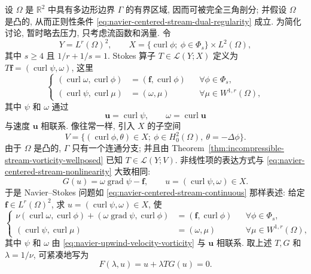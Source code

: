 设 $\Omega$ 是 $\mathbb R^2$ 中具有多边形边界 $\Gamma$ 的有界区域, 因而可被完全三角剖分;
并假设 $\Omega$ 是凸的, 从而正则性条件
\eqref{eq:navier-centered-stream-dual-regularity} 成立. 为简化讨论, 暂时略去压力,
只考虑流函数和涡量. 令
\[
Y=L^r(\Omega)^2,
\qquad
X=\{\operatorname{curl}\phi;\ \phi\in\Phi_s\}\times L^2(\Omega),
\]
其中 $s\geq4$ 且 $1/r+1/s=1$. Stokes 算子 $T\in\mathcal L(Y;X)$ 定义为
$T\boldsymbol f=(\operatorname{curl}\psi,\omega)$, 这里
\begin{equation}\label{eq:navier-upwind-stokes-operator}
\left\{
\begin{aligned}
(\operatorname{curl}\omega,\operatorname{curl}\phi)
&=(\boldsymbol f,\operatorname{curl}\phi)
&&\forall\phi\in\Phi_s,\\
(\operatorname{curl}\psi,\operatorname{curl}\mu)
&=(\omega,\mu)
&&\forall\mu\in W^{1,r}(\Omega),
\end{aligned}
\right.
\end{equation}
其中 $\psi$ 和 $\omega$ 通过
\begin{equation}\label{eq:navier-upwind-velocity-vorticity}
\boldsymbol u=\operatorname{curl}\psi,
\qquad
\omega=\operatorname{curl}\boldsymbol u
\end{equation}
与速度 $\boldsymbol u$ 相联系. 像往常一样, 引入 $X$ 的子空间
\begin{equation}\label{eq:navier-upwind-continuous-subspace}
V=\{(\operatorname{curl}\phi,\theta)\in X;
\ \phi\in H_0^2(\Omega),\ \theta=-\Delta\phi\}.
\end{equation}
由于 $\Omega$ 是凸的, $\Gamma$ 只有一个连通分支; 并且由
Theorem~\ref{thm:incompressible-stream-vorticity-wellposed} 已知 $T\in\mathcal L(Y;V)$.
非线性项的表达方式与 \eqref{eq:navier-centered-stream-nonlinearity} 大致相同:
\begin{equation}\label{eq:navier-upwind-nonlinearity}
G(u)=\omega\operatorname{grad}\psi-\boldsymbol f,
\qquad
u=(\operatorname{curl}\psi,\omega)\in X.
\end{equation}
于是 Navier--Stokes 问题如 \eqref{eq:navier-centered-stream-continuous} 那样表述:
给定 $\boldsymbol f\in L^r(\Omega)^2$, 求
$u=(\operatorname{curl}\psi,\omega)\in X$, 使
\begin{equation}\label{eq:navier-upwind-continuous-problem}
\left\{
\begin{aligned}
\nu(\operatorname{curl}\omega,\operatorname{curl}\phi)
+(\omega\operatorname{grad}\psi,\operatorname{curl}\phi)
&=(\boldsymbol f,\operatorname{curl}\phi)
&&\forall\phi\in\Phi_s,\\
(\operatorname{curl}\psi,\operatorname{curl}\mu)
&=(\omega,\mu)
&&\forall\mu\in W^{1,r}(\Omega),
\end{aligned}
\right.
\end{equation}
其中 $\psi$ 和 $\omega$ 由 \eqref{eq:navier-upwind-velocity-vorticity} 与 $\boldsymbol u$
相联系. 取上述 $T,G$ 和 $\lambda=1/\nu$, 可紧凑地写为
\begin{equation}\label{eq:navier-upwind-continuous-operator}
F(\lambda,u)=u+\lambda TG(u)=0.
\end{equation}

